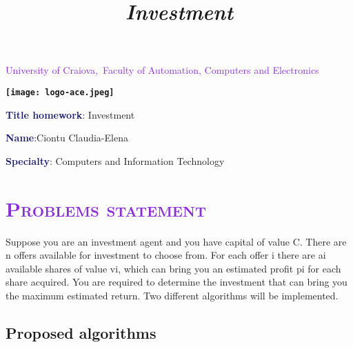 \documentclass{article}
\begin{document}
\thispagestyle{plain}%




\begin{center}
\Large
\textcolor{BlueViolet}{{University of Craiova,\ Faculty of Automation, Computers and Electronics}}\\
    \vspace{7mm}
     \end{center} 
    \begin{center}
          
    \textbf{\texttt{[image: logo-ace.jpeg]}}
\end{center}

\title{\textbf{\textit{Investment}}}

\vspace{1em}
\LARGE
\textbf{\textcolor{MidnightBlue}{{  Title homework}}}: Investment

\LARGE
\vspace{1em}
\textbf{\textcolor{MidnightBlue}{{Name}}}:Ciontu Claudia-Elena

\LARGE
\vspace{1em}
\textbf{\textcolor{MidnightBlue}{{Specialty}}}: Computers and Information Technology








\newpage
\renewcommand*\contentsname{\centering \textcolor{blue}{{ Contents}}\\
\vspace{1cm} } 
\large \tableofcontents
\newpage
\section{\bfseries\scshape\textcolor{BlueViolet}{Problems statement}}
Suppose you are an investment agent and you have capital of value C. There are n offers available for investment to choose from. For each offer i there are ai available shares of value vi, which can bring you an estimated profit pi for each share acquired. You are required to determine the investment that can bring you the maximum estimated return. Two different algorithms will be implemented.


\subsection{\textcolor{Periwinkle}{Proposed algorithms}}
\end{document}
